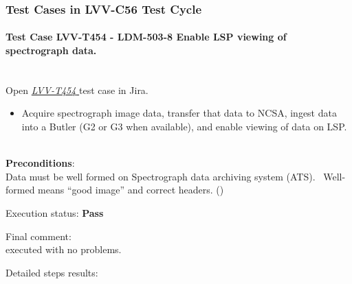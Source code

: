 \documentclass[DM,lsstdraft,STR,toc]{lsstdoc}
\providecommand{\tightlist}{
  \setlength{\itemsep}{0pt}\setlength{\parskip}{0pt}}
\begin{document}
\subsubsection{Test Cases in LVV-C56 Test Cycle}

\paragraph{Test Case LVV-T454 - LDM-503-8 Enable LSP viewing of spectrograph data.
 }\mbox{}\\

Open  \href{https://jira.lsstcorp.org/secure/Tests.jspa#/testCase/LVV-T454}{\textit{ LVV-T454 } }
test case in Jira.

\begin{itemize}
\tightlist
\item
  Acquire spectrograph image data, transfer that data to NCSA, ingest
  data into a Butler (G2 or G3 when available), and enable viewing of
  data on LSP. ~
\end{itemize}


\textbf{ Preconditions}:\\
Data must be well formed on Spectrograph data archiving system (ATS).
~Well-formed means ``good image'' and correct headers. () ~


Execution status: {\bf Pass }

Final comment:\\executed with no problems.~



Detailed steps results:
\end{document}
